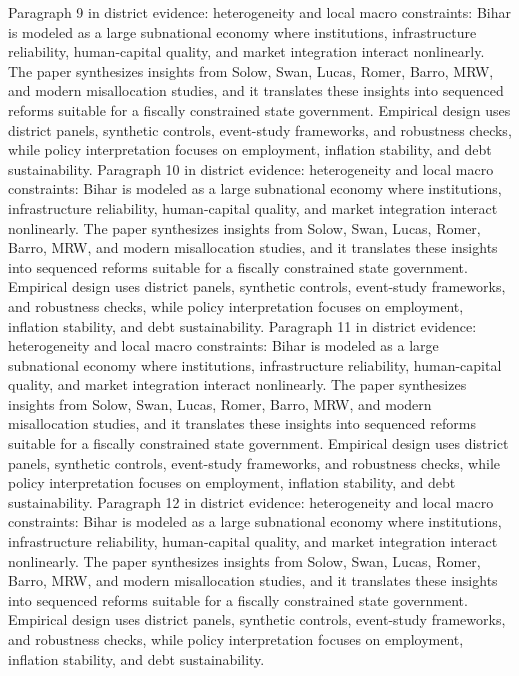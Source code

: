 \documentclass[preprint,12pt]{elsarticle}
\begin{document}
Paragraph 9 in district evidence: heterogeneity and local macro constraints: Bihar is modeled as a large subnational economy where institutions, infrastructure reliability, human-capital quality, and market integration interact nonlinearly. The paper synthesizes insights from Solow, Swan, Lucas, Romer, Barro, MRW, and modern misallocation studies, and it translates these insights into sequenced reforms suitable for a fiscally constrained state government. Empirical design uses district panels, synthetic controls, event-study frameworks, and robustness checks, while policy interpretation focuses on employment, inflation stability, and debt sustainability.
Paragraph 10 in district evidence: heterogeneity and local macro constraints: Bihar is modeled as a large subnational economy where institutions, infrastructure reliability, human-capital quality, and market integration interact nonlinearly. The paper synthesizes insights from Solow, Swan, Lucas, Romer, Barro, MRW, and modern misallocation studies, and it translates these insights into sequenced reforms suitable for a fiscally constrained state government. Empirical design uses district panels, synthetic controls, event-study frameworks, and robustness checks, while policy interpretation focuses on employment, inflation stability, and debt sustainability.
Paragraph 11 in district evidence: heterogeneity and local macro constraints: Bihar is modeled as a large subnational economy where institutions, infrastructure reliability, human-capital quality, and market integration interact nonlinearly. The paper synthesizes insights from Solow, Swan, Lucas, Romer, Barro, MRW, and modern misallocation studies, and it translates these insights into sequenced reforms suitable for a fiscally constrained state government. Empirical design uses district panels, synthetic controls, event-study frameworks, and robustness checks, while policy interpretation focuses on employment, inflation stability, and debt sustainability.
Paragraph 12 in district evidence: heterogeneity and local macro constraints: Bihar is modeled as a large subnational economy where institutions, infrastructure reliability, human-capital quality, and market integration interact nonlinearly. The paper synthesizes insights from Solow, Swan, Lucas, Romer, Barro, MRW, and modern misallocation studies, and it translates these insights into sequenced reforms suitable for a fiscally constrained state government. Empirical design uses district panels, synthetic controls, event-study frameworks, and robustness checks, while policy interpretation focuses on employment, inflation stability, and debt sustainability.
\end{document}
